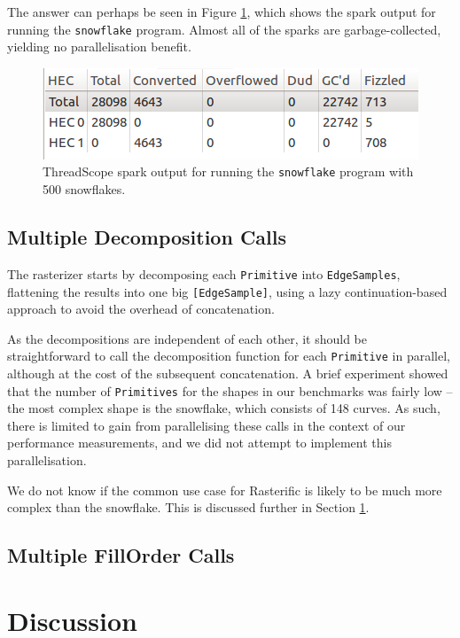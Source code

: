 \documentclass[12pt, a4paper]{article}
\begin{document}
The answer can perhaps be seen in Figure \ref{fig:combineindex-sparks}, which shows the spark output for running the \texttt{snowflake} program. Almost all of the sparks are garbage-collected, yielding no parallelisation benefit.

 \begin{figure}[h!]
  \centering
  \includegraphics[scale=1]{../threadscope/combineindex/sparks}
  \caption{ThreadScope spark output for running the \texttt{snowflake} program with 500 snowflakes.}
  \label{fig:combineindex-sparks}
\end{figure}

\subsection{Multiple Decomposition Calls}

The rasterizer starts by decomposing each \texttt{Primitive} into \texttt{EdgeSamples}, flattening the results into one big \texttt{[EdgeSample]}, using a lazy continuation-based approach to avoid the overhead of concatenation.

As the decompositions are independent of each other, it should be straightforward to call the decomposition function for each \texttt{Primitive} in parallel, although at the cost of the subsequent concatenation. A brief experiment showed that the number of \texttt{Primitives} for the shapes in our benchmarks was fairly low -- the most complex shape is the snowflake, which consists of 148 curves. As such, there is limited to gain from parallelising these calls in the context of our performance measurements, and we did not attempt to implement this parallelisation.

We do not know if the common use case for Rasterific is likely to be much more complex than the snowflake. This is discussed further in Section \ref{discussion}.

\subsection{Multiple FillOrder Calls}

\section{Discussion}\label{discussion}
\end{document}
